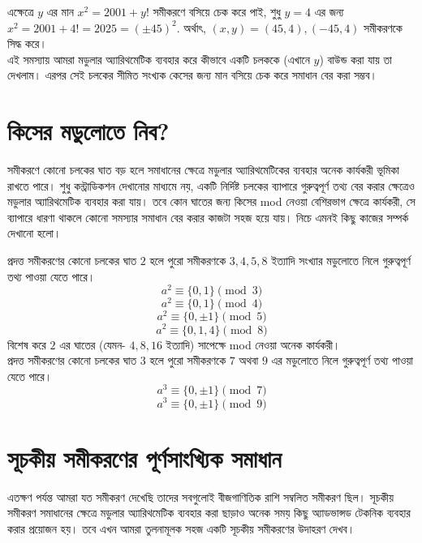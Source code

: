 \documentclass[11pt]{report}
\begin{document}
এক্ষেত্রে $y$ এর মান $x^2=2001+y!$ সমীকরণে বসিয়ে চেক করে পাই, শুধু $y=4$ এর জন্য $x^2 = 2001 + 4! = 2025 = (\pm 45)^2.$ অর্থাৎ, $(x,y) = (45, 4), (-45, 4)$ সমীকরণকে সিদ্ধ করে।\\

এই সমস্যায় আমরা মডুলার অ্যারিথমেটিক ব্যবহার করে কীভাবে একটি চলককে (এখানে $y$) বাউন্ড করা যায় তা দেখলাম। এরপর সেই চলকের সীমিত সংখ্যক কেসের জন্য মান বসিয়ে চেক করে সমাধান বের করা সম্ভব।\\

\newpage

\section{কিসের মডুলোতে নিব?}

সমীকরণে কোনো চলকের ঘাত বড় হলে সমাধানের ক্ষেত্রে মডুলার অ্যারিথমেটিকের ব্যবহার অনেক কার্যকরী ভূমিকা রাখতে পারে। শুধু কন্ট্রাডিকশন দেখানোর মাধ্যমে নয়, একটি নির্দিষ্ট চলকের ব্যাপারে গুরুত্বপূর্ণ তথ্য বের করার ক্ষেত্রেও মডুলার অ্যারিথমেটিক ব্যবহার করা যায়। তবে কোন ঘাতের জন্য কিসের mod নেওয়া বেশিরভাগ ক্ষেত্রে কার্যকরী, সে ব্যাপারে ধারণা থাকলে কোনো সমস্যার সমাধান বের করার কাজটা সহজ হয়ে যায়। নিচে এমনই কিছু কাজের সম্পর্ক দেখানো হলো।\\

\begin{tcolorbox}[colframe=blue!80!blue]

প্রদত্ত সমীকরণের কোনো চলকের ঘাত $2$ হলে পুরো সমীকরণকে $3, 4, 5, 8$ ইত্যাদি সংখ্যার মডুলোতে নিলে গুরুত্বপূর্ণ তথ্য পাওয়া যেতে পারে।\\
$$a^2 \equiv \{0,1\} \pmod{3}$$
$$a^2 \equiv \{0,1\} \pmod{4}$$
$$a^2 \equiv \{0, \pm 1\} \pmod{5}$$
$$a^2 \equiv \{0,1,4\} \pmod{8}$$
বিশেষ করে $2$ এর ঘাতের (যেমন- $4, 8, 16$ ইত্যাদি) সাপেক্ষে mod নেওয়া অনেক কার্যকরী।\\

প্রদত্ত সমীকরণের কোনো চলকের ঘাত $3$ হলে পুরো সমীকরণকে $7$ অথবা $9$ এর মডুলোতে নিলে গুরুত্বপূর্ণ তথ্য পাওয়া যেতে পারে।\\
$$a^3 \equiv \{0, \pm 1\} \pmod{7}$$
$$a^3 \equiv \{0, \pm 1\} \pmod{9}$$

\end{tcolorbox}

\newpage

\section{সূচকীয় সমীকরণের পূর্ণসাংখ্যিক সমাধান}

এতক্ষণ পর্যন্ত আমরা যত সমীকরণ দেখেছি তাদের সবগুলোই বীজগাণিতিক রাশি সম্বলিত সমীকরণ ছিল। সূচকীয় সমীকরণ সমাধানের ক্ষেত্রে মডুলার অ্যারিথমেটিক ব্যবহার করা ছাড়াও অনেক সময় কিছু অ্যাডভান্সড টেকনিক ব্যবহার করার প্রয়োজন হয়। তবে এখন আমরা তুলনামূলক সহজ একটি সূচকীয় সমীকরণের উদাহরণ দেখব।\\
\end{document}
